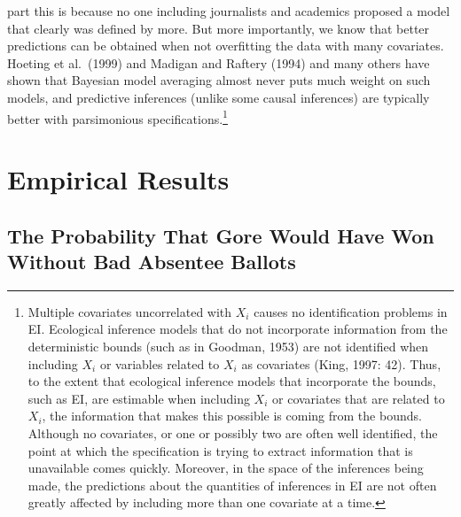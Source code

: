 \documentclass[11pt,titlepage]{article}
\begin{document}
part this is because no one including journalists and academics
proposed a model that clearly was defined by more.  But more
importantly, we know that better predictions can be obtained when not
overfitting the data with many covariates.  Hoeting et al.\ (1999) and
Madigan and Raftery (1994) and many others have shown that Bayesian
model averaging almost never puts much weight on such models, and
predictive inferences (unlike some causal inferences) are typically
better with parsimonious specifications.\footnote{Multiple covariates
  uncorrelated with $X_i$ causes no identification problems in EI.
  Ecological inference models that do not incorporate information from
  the deterministic bounds (such as in Goodman,
  1953\nocite{goodman53}) are not identified when including $X_i$ or
  variables related to $X_i$ as covariates (King, 1997: 42).  Thus, to
  the extent that ecological inference models that incorporate the
  bounds, such as EI, are estimable when including $X_i$ or covariates
  that are related to $X_i$, the information that makes this possible
  is coming from the bounds.  Although no covariates, or one or
  possibly two are often well identified, the point at which the
  specification is trying to extract information that is unavailable
  comes quickly.  Moreover, in the space of the inferences being made,
  the predictions about the quantities of inferences in EI are not
  often greatly affected by including more than one covariate at a
  time.}

\section{Empirical Results}
\label{s:outcome}

\subsection{The Probability That Gore Would Have Won Without Bad 
Absentee Ballots}
\end{document}
